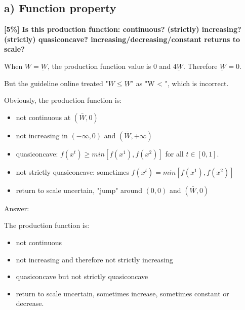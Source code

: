 \documentclass{article}
\begin{document}
\subsection{a) Function property}

\textbf{ [5\%] Is this production function: continuous? (strictly) increasing? (strictly) quasiconcave? increasing/decreasing/constant returns
to scale?}

\begin{mdframed}[backgroundcolor=blue!20,linecolor=white]

When $W = \underbar{W}$, the production function value is $0$ and $4\underbar{W}$. Therefore $\underbar{W} = 0$.

But the guideline online treated "$W \le \underbar{W}$" as "W < ", which is incorrect.

\begin{center}
\label{fig:hydro}
\end{center}
\vspace{2mm}

Obviously, the production function is:
\begin{itemize}
\item not continuous at $(\bar{W},0)$
\item not increasing in $(-\infty,0)$ and $(\bar{W},+\infty)$
\item quasiconcave: $f (x^t) \ge min[f (x^1), f (x^2)]$ for all $t ∈ [0, 1]$.
\item not strictly quasiconcave: sometimes $f (x^t) = min[f (x^1), f (x^2)]$
\item return to scale uncertain, "jump" around $(0,0)$ and $(\bar{W},0)$
\end{itemize}
\end{mdframed}

Answer:

The production function is:
\begin{itemize}
\item not continuous
\item not increasing and therefore not strictly increasing
\item quasiconcave but not strictly quasiconcave
\item return to scale uncertain, sometimes increase, sometimes constant or decrease.
\end{itemize}
\end{document}
